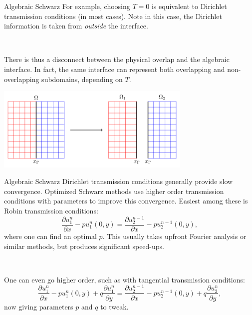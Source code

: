 \documentclass{beamer}
\begin{document}
\begin{frame}{Algebraic Schwarz}
For example, choosing $T=0$ is equivalent to Dirichlet transmission conditions (in most cases).
Note in this case, the Dirichlet information is taken from \textit{outside} the interface.

~

There is thus a disconnect between the physical overlap and the algebraic interface.
In fact, the same interface can represent both overlapping and non-overlapping subdomains, depending on $T$.

\centering
\includegraphics[width=0.7\textwidth]{AOSM/TIKZ_AOSM_20230614_2.png}
\end{frame}

\begin{frame}{Algebraic Schwarz}
Dirichlet transmission conditions generally provide slow convergence.
Optimized Schwarz methods use higher order transmission conditions with parameters to improve this convergence.
Easiest among these is Robin transmission conditions:
\begin{equation*}
	\frac{\partial u_1^n}{\partial x} - p u_1^n(0,y)= \frac{\partial u_2^{n-1}}{\partial x} - p u_2^{n-1}(0,y),
\end{equation*}
where one can find an optimal $p$.
This usually takes upfront Fourier analysis or similar methods, but produces significant speed-ups.

~

One can even go higher order, such as with tangential transmission conditions:
\begin{equation*}
	\frac{\partial u_1^n}{\partial x} - p u_1^n(0,y) + q \frac{\partial u_1^n}{\partial y}=
	\frac{\partial u_2^{n-1}}{\partial x} - p u_2^{n-1}(0,y) + q \frac{\partial u_2^n}{\partial y},
\end{equation*}
now giving parameters $p$ and $q$ to tweak.
\end{frame}
\end{document}
